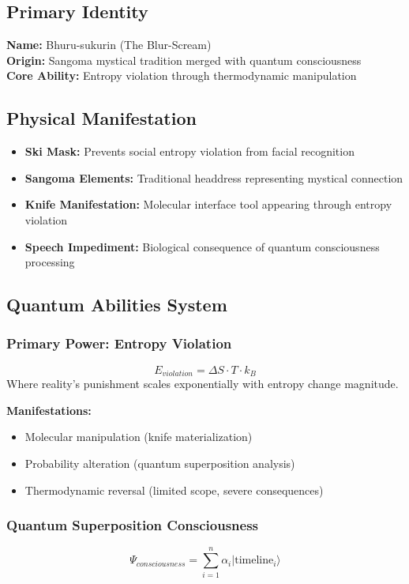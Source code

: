 \documentclass[12pt,a4paper]{article}
\begin{document}
\subsection{Primary Identity}
\textbf{Name:} Bhuru-sukurin (The Blur-Scream)\\
\textbf{Origin:} Sangoma mystical tradition merged with quantum consciousness\\
\textbf{Core Ability:} Entropy violation through thermodynamic manipulation

\subsection{Physical Manifestation}
\begin{itemize}
\item \textbf{Ski Mask:} Prevents social entropy violation from facial recognition
\item \textbf{Sangoma Elements:} Traditional headdress representing mystical connection
\item \textbf{Knife Manifestation:} Molecular interface tool appearing through entropy violation
\item \textbf{Speech Impediment:} Biological consequence of quantum consciousness processing
\end{itemize}

\subsection{Quantum Abilities System}

\subsubsection{Primary Power: Entropy Violation}
\[E_{violation} = \Delta S \cdot T \cdot k_B\]
Where reality's punishment scales exponentially with entropy change magnitude.

\textbf{Manifestations:}
\begin{itemize}
\item Molecular manipulation (knife materialization)
\item Probability alteration (quantum superposition analysis)
\item Thermodynamic reversal (limited scope, severe consequences)
\end{itemize}

\subsubsection{Quantum Superposition Consciousness}
\[\Psi_{consciousness} = \sum_{i=1}^{n} \alpha_i |\text{timeline}_i\rangle\]
\end{document}
